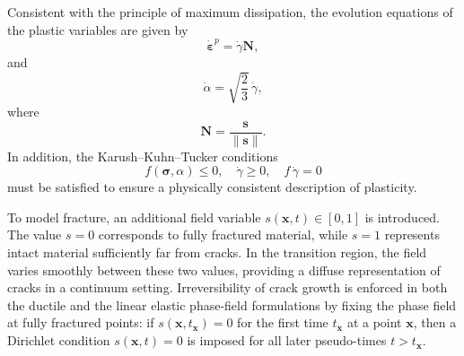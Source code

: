 \documentclass[pdflatex,sn-mathphys-num]{sn-jnl}%
\theoremstyle{thmstyleone}%
\theoremstyle{thmstyletwo}%
\theoremstyle{thmstylethree}%
\begin{document}
Consistent with the principle of maximum dissipation, the evolution equations of the plastic variables are given by
\begin{equation}
    \dot{\boldsymbol{\varepsilon}}^p = \dot{\gamma}\boldsymbol{N},
    \label{eq:evolution_eps_p}
\end{equation}
and
\begin{equation}
    \dot{\alpha} = \sqrt{\dfrac{2}{3}}\,\dot{\gamma},
    \label{eq:evolution_alpha}
\end{equation}
where
\begin{equation}
    \boldsymbol{N} = \dfrac{\boldsymbol{s}}{\|\boldsymbol{s}\|}.
\end{equation}
In addition, the Karush--Kuhn--Tucker conditions
\begin{equation}
    f(\boldsymbol{\sigma},\alpha) \le 0, 
    \quad \dot{\gamma} \ge 0, 
    \quad f\,\dot{\gamma} = 0
\end{equation}
must be satisfied to ensure a physically consistent description of plasticity.

To model fracture, an additional field variable $s(\boldsymbol{x},t) \in [0,1]$ is introduced. 
The value $s=0$ corresponds to fully fractured material, while $s=1$ represents intact material sufficiently far from cracks. 
In the transition region, the field varies smoothly between these two values, providing a diffuse representation of cracks in a continuum setting.
Irreversibility of crack growth is enforced in both the ductile and the linear elastic phase-field formulations by fixing the phase field at fully fractured points: if $s(\boldsymbol{x},t_{\boldsymbol{x}})=0$ for the first time $t_{\boldsymbol{x}}$ at a point $\boldsymbol{x}$, then a Dirichlet condition $s(\boldsymbol{x},t)=0$ is imposed for all later pseudo-times $t>t_{\boldsymbol{x}}$.
\end{document}
